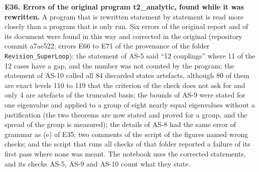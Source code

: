 \documentclass[
  10pt,
]{article}
\begin{document}
\textbf{E36. Errors of the original program t2\_analytic, found while it
was rewritten.} A program that is rewritten statement by statement is
read more closely than a program that is only run. Six errors of the
original report and of its document were found in this way and corrected
in the original (repository commit a7ae522; errors E66 to E71 of the
provenance of the folder \texttt{Revision\_SuperLoop}): the statement of
AS-5 said ``12 couplings'' where 11 of the 12 cases have a gap, and the
number was not counted by the program; the statement of AS-10 called all
84 discarded states artefacts, although 80 of them are exact levels 110
to 119 that the criterion of the check does not ask for and only 4 are
artefacts of the truncated basis; the bounds of AS-9 were stated for one
eigenvalue and applied to a group of eight nearly equal eigenvalues
without a justification (the two theorems are now stated and proved for
a group, and the spread of the group is measured); the details of AS-8
had the same error of grammar as (e) of E35; two comments of the script
of the figures named wrong checks; and the script that runs all checks
of that folder reported a failure of its first pass where none was
meant. The notebook uses the corrected statements, and its checks AS-5,
AS-9 and AS-10 count what they state.
\end{document}
